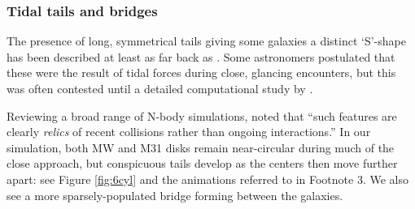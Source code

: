 \documentclass[twocolumn]{aastex63}
\newcommand{\todo}{\color{red}{TODO}\color{black}\hspace{2mm}}
\begin{document}
\todo{Clarify this!}

\subsubsection{Tidal tails and bridges}


The presence of long, symmetrical tails giving some galaxies a distinct `S'-shape has been described at least as far back as \citet{zwicky_novel_1955}. Some astronomers postulated that these were the result of tidal forces during close, glancing encounters, but this was often contested until a detailed computational study by \citet{toomre_galactic_1972}.

Reviewing a broad range of N-body simulations, \citet{barnes_dynamics_1992} noted that ``such features are clearly \textit{relics} of recent collisions rather than ongoing interactions.'' In our simulation, both MW and M31 disks remain near-circular during much of the close approach, but conspicuous tails develop as the centers then move further apart: see Figure \ref{fig:6cyl} and the animations referred to in Footnote 3. We also see a more sparsely-populated bridge forming between the galaxies.
\end{document}
